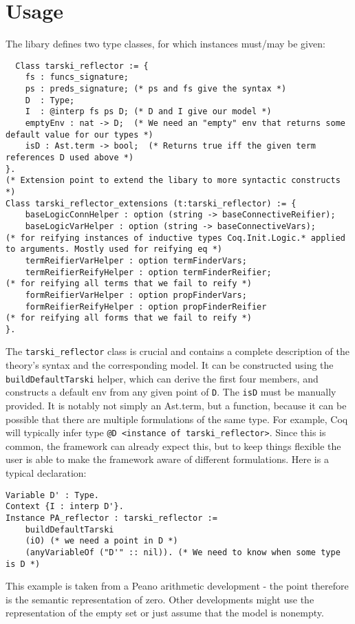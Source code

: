 \documentclass[11pt,a4paper]{article}
\begin{document}
\section{Usage}
The libary defines two type classes, for which instances must/may be given:
\begin{lstlisting}
  Class tarski_reflector := {
	fs : funcs_signature; 
	ps : preds_signature; (* ps and fs give the syntax *)
	D  : Type;
	I  : @interp fs ps D; (* D and I give our model *)
	emptyEnv : nat -> D;  (* We need an "empty" env that returns some default value for our types *)
	isD : Ast.term -> bool;  (* Returns true iff the given term references D used above *)
}. 
(* Extension point to extend the libary to more syntactic constructs *)
Class tarski_reflector_extensions (t:tarski_reflector) := {
	baseLogicConnHelper : option (string -> baseConnectiveReifier); 
	baseLogicVarHelper : option (string -> baseConnectiveVars);                 (* for reifying instances of inductive types Coq.Init.Logic.* applied to arguments. Mostly used for reifying eq *)
	termReifierVarHelper : option termFinderVars;    
	termReifierReifyHelper : option termFinderReifier;                          (* for reifying all terms that we fail to reify *)
	formReifierVarHelper : option propFinderVars;
	formReifierReifyHelper : option propFinderReifier                           (* for reifying all forms that we fail to reify *)
}.
\end{lstlisting}
The \lstinline|tarski_reflector| class is crucial and contains a complete description of the theory's syntax and the corresponding model. It can be constructed using the \lstinline|buildDefaultTarski| helper, which can derive the first four members, and constructs a default env from any given point of \lstinline|D|. The \lstinline|isD| must be manually provided. It is notably not simply an Ast.term, but a function, because it can be possible that there are multiple formulations of the same type. For example, Coq will typically infer type \lstinline|@D <instance of tarski_reflector>|. Since this is common, the framework can already expect this, but to keep things flexible the user is able to make the framework aware of different formulations. Here is a typical declaration:
\begin{lstlisting}
Variable D' : Type.
Context {I : interp D'}.
Instance PA_reflector : tarski_reflector :=
	buildDefaultTarski 
	(iO) (* we need a point in D *)
	(anyVariableOf ("D'" :: nil)). (* We need to know when some type is D *)
\end{lstlisting}
This example is taken from a Peano arithmetic development - the point therefore is the semantic representation of zero. Other developments might use the representation of the empty set or just assume that the model is nonempty.
\end{document}
